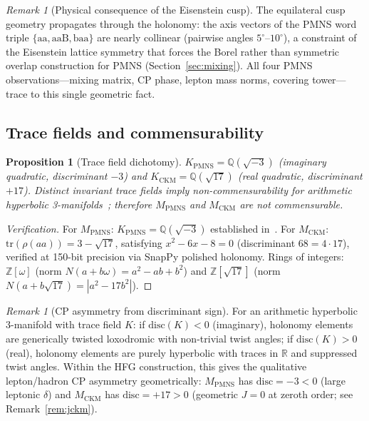 \documentclass[11pt,a4paper]{article}
\newtheorem{proposition}[theorem]{Proposition}
\theoremstyle{definition}
\theoremstyle{remark}
\newtheorem{remark}[theorem]{Remark}
\newcommand{\QQ}{\mathbb{Q}}
\newcommand{\MPMNS}{M_{\mathrm{PMNS}}}
\newcommand{\MCKM}{M_{\mathrm{CKM}}}
\newcommand{\KPMNS}{K_{\mathrm{PMNS}}}
\newcommand{\KCKM}{K_{\mathrm{CKM}}}
\newcommand{\Zom}{\mathbb{Z}[\omega]}
\newcommand{\Zsev}{\mathbb{Z}[\sqrt{17}]}
\begin{document}
\begin{remark}[Physical consequence of the Eisenstein cusp]
The equilateral cusp geometry propagates through the holonomy:
the axis vectors of the PMNS word triple
$\{\mathrm{aa},\mathrm{aaB},\mathrm{baa}\}$ are nearly collinear
(pairwise angles $5^\circ$--$10^\circ$), a constraint of the
Eisenstein lattice symmetry that forces the Borel rather than
symmetric overlap construction for PMNS
(Section~\ref{sec:mixing}).
All four PMNS observations---mixing matrix, CP phase, lepton
mass norms, covering tower---trace to this single geometric fact.
\end{remark}

\subsection{Trace fields and commensurability}

\begin{proposition}[Trace field dichotomy]
\label{prop:tracefields}
$\KPMNS = \QQ(\sqrt{-3})$ (imaginary quadratic,
discriminant $-3$) and $\KCKM = \QQ(\sqrt{17})$
(real quadratic, discriminant $+17$).
Distinct invariant trace fields imply non-commensurability
for arithmetic hyperbolic 3-manifolds~\cite{MaclachlanReid};
therefore $\MPMNS$ and $\MCKM$ are not commensurable.
\end{proposition}

\begin{proof}[Verification]
For $\MPMNS$: $\KPMNS = \QQ(\sqrt{-3})$ established in~\cite{Chinburg98}.
For $\MCKM$: $\mathrm{tr}(\rho(aa)) = 3-\sqrt{17}$,
satisfying $x^2-6x-8=0$ (discriminant $68=4\cdot17$),
verified at 150-bit precision via SnapPy polished holonomy.
Rings of integers: $\Zom$ (norm $N(a+b\omega)=a^2-ab+b^2$) and
$\Zsev$ (norm $N(a+b\sqrt{17})=|a^2-17b^2|$).
\end{proof}

\begin{remark}[CP asymmetry from discriminant sign]
\label{rem:cp_asym}
For an arithmetic hyperbolic 3-manifold with trace field $K$:
if $\mathrm{disc}(K)<0$ (imaginary), holonomy elements are
generically twisted loxodromic with non-trivial twist angles;
if $\mathrm{disc}(K)>0$ (real), holonomy elements are purely
hyperbolic with traces in $\mathbb{R}$ and suppressed twist angles.
Within the HFG construction, this gives the qualitative
lepton/hadron CP asymmetry geometrically:
$\MPMNS$ has $\mathrm{disc}=-3 < 0$ (large leptonic $\delta$)
and $\MCKM$ has $\mathrm{disc}=+17 > 0$ (geometric $J=0$
at zeroth order; see Remark~\ref{rem:jckm}).
\end{remark}
\end{document}

